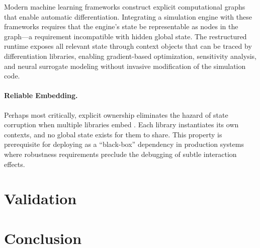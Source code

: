 Modern machine learning frameworks construct explicit computational graphs that enable automatic differentiation. Integrating a simulation engine with these frameworks requires that the engine's state be representable as nodes in the graph---a requirement incompatible with hidden global state. The restructured runtime exposes all relevant state through context objects that can be traced by differentiation libraries, enabling gradient-based optimization, sensitivity analysis, and neural surrogate modeling without invasive modification of the simulation code.

\paragraph{Reliable Embedding.}

Perhaps most critically, explicit ownership eliminates the hazard of state corruption when multiple libraries embed \OpenSees{}. Each library instantiates its own contexts, and no global state exists for them to share. This property is prerequisite for deploying \OpenSees{} as a ``black-box'' dependency in production systems where robustness requirements preclude the debugging of subtle interaction effects.

\section{Validation}\label{sec:validation}



\section{Conclusion}\label{sec:conclusion}

